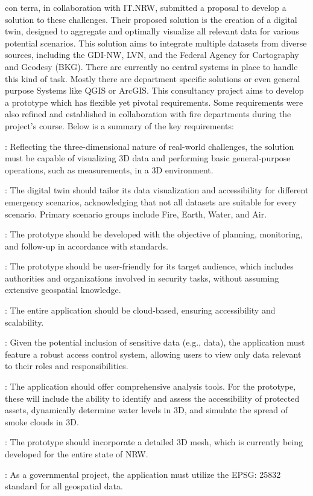\documentclass[11pt, titlepage, a4paper]{article}
\begin{document}
con terra, in collaboration with IT.NRW, submitted a proposal to develop a solution to these challenges. Their proposed solution is the creation of a digital twin, designed to aggregate and optimally visualize all relevant data for various potential scenarios. This solution aims to integrate multiple datasets from diverse sources, including the GDI-NW, LVN, and the Federal Agency for Cartography and Geodesy (BKG).
There are currently no central systems in place to handle this kind of task. Mostly there are department specific solutions or even general purpose Systems like QGIS or ArcGIS.
This consultancy project aims to develop a prototype which has flexible yet pivotal requirements. Some requirements were also refined and established in collaboration with fire departments during the project's course. Below is a summary of the key requirements:

\begin{description}[]
    \item[Three-Dimensional Capability]: Reflecting the three-dimensional nature of real-world challenges, the solution must be capable of visualizing 3D data and performing basic general-purpose operations, such as measurements, in a 3D environment.
    \item[Scenario-Optimized Geodata]: The digital twin should tailor its data visualization and accessibility for different emergency scenarios, acknowledging that not all datasets are suitable for every scenario. Primary scenario groups include Fire, Earth, Water, and Air.
    \item[Compliance with \glsxtrshort{bhkg}]: The prototype should be developed with the objective of planning, monitoring, and follow-up in accordance with  standards.
    \item[Target Group - Authorities and Security Organizations]: The prototype should be user-friendly for its target audience, which includes authorities and organizations involved in security tasks, without assuming extensive geospatial knowledge.
    \item[Cloud-Based Solution]: The entire application should be cloud-based, ensuring accessibility and scalability.
    \item[Fine-Grained Access Control]: Given the potential inclusion of sensitive data (e.g.,  data), the application must feature a robust access control system, allowing users to view only data relevant to their roles and responsibilities.
    \item[Analysis Tools]: The application should offer comprehensive analysis tools. For the prototype, these will include the ability to identify and assess the accessibility of protected assets, dynamically determine water levels in 3D, and simulate the spread of smoke clouds in 3D.
    \item[Integration of 3D Meshes]: The prototype should incorporate a detailed 3D mesh, which is currently being developed for the entire state of NRW.
    \item[EPSG: 25832 Standard]: As a governmental project, the application must utilize the EPSG: 25832 standard for all geospatial data.
\end{description}
\end{document}
